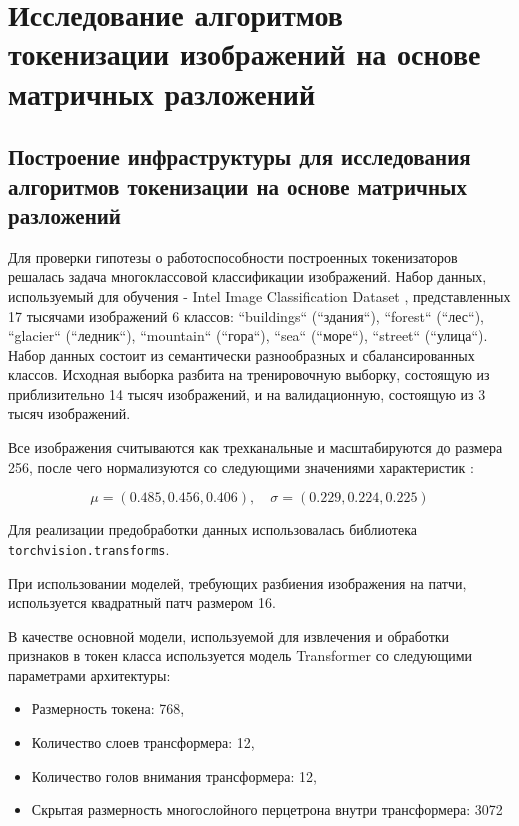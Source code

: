\documentclass[times,specification,annotation]{itmo-student-thesis}
\begin{document}
\chapter{Исследование алгоритмов токенизации изображений на основе матричных разложений}

\section{Построение инфраструктуры для исследования алгоритмов токенизации на основе матричных разложений}

Для проверки гипотезы о работоспособности построенных токенизаторов решалась задача многоклассовой классификации изображений. Набор данных, используемый для обучения - Intel Image Classification Dataset \cite{intel_image_dataset}, представленных 17 тысячами изображений 6 классов: ``buildings`` (``здания``), ``forest`` (``лес``), ``glacier`` (``ледник``), ``mountain`` (``гора``), ``sea`` (``море``), ``street`` (``улица``). Набор данных состоит из семантически разнообразных и сбалансированных классов. Исходная выборка разбита на тренировочную выборку, состоящую из приблизительно 14 тысяч изображений, и на валидационную, состоящую из 3 тысяч изображений.


Все изображения считываются как трехканальные и масштабируются до размера 256, после чего нормализуются со следующими значениями характеристик \cite{torchvision_normalization}: 

$$
\mu = (0.485, 0.456, 0.406), \quad \sigma = (0.229, 0.224, 0.225)
$$

Для реализации предобработки данных использовалась библиотека \texttt{torchvision.transforms}.

При использовании моделей, требующих разбиения изображения на патчи, используется квадратный патч размером 16.

В качестве основной модели, используемой для извлечения и обработки признаков в токен класса используется модель Transformer со следующими параметрами архитектуры:

\begin{itemize}
    \item Размерность токена: 768,
    \item Количество слоев трансформера: 12,
    \item Количество голов внимания трансформера: 12,
    \item Скрытая размерность многослойного перцетрона внутри трансформера: 3072
\end{itemize}
\end{document}

